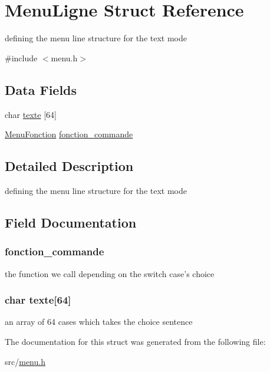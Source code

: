 \hypertarget{struct_menu_ligne}{\section{Menu\-Ligne Struct Reference}
\label{struct_menu_ligne}
}


defining the menu line structure for the text mode  




{\ttfamily \#include $<$menu.\-h$>$}

\subsection*{Data Fields}
\begin{DoxyCompactItemize}
\item 
char \hyperlink{struct_menu_ligne_a6d9bcb55844bb23ab938309e06e518d1}{texte} \mbox{[}64\mbox{]}
\item 
\hyperlink{menu_8h_a8bb8308ed871ab4b0f743a10a35d68ec}{Menu\-Fonction} \hyperlink{struct_menu_ligne_af21aefbf248a35b3a12018a8eacabc37}{fonction\-\_\-commande}
\end{DoxyCompactItemize}


\subsection{Detailed Description}
defining the menu line structure for the text mode 

\subsection{Field Documentation}
\hypertarget{struct_menu_ligne_af21aefbf248a35b3a12018a8eacabc37}{
\subsubsection[{fonction\-\_\-commande}]{ fonction\-\_\-commande}}\label{struct_menu_ligne_af21aefbf248a35b3a12018a8eacabc37}
the function we call depending on the switch case's choice \hypertarget{struct_menu_ligne_a6d9bcb55844bb23ab938309e06e518d1}{
\subsubsection[{texte}]{\setlength{\rightskip}{0pt plus 5cm}char texte\mbox{[}64\mbox{]}}}\label{struct_menu_ligne_a6d9bcb55844bb23ab938309e06e518d1}
an array of 64 cases which takes the choice sentence 

The documentation for this struct was generated from the following file\-:\begin{DoxyCompactItemize}
\item 
src/\hyperlink{menu_8h}{menu.\-h}\end{DoxyCompactItemize}
